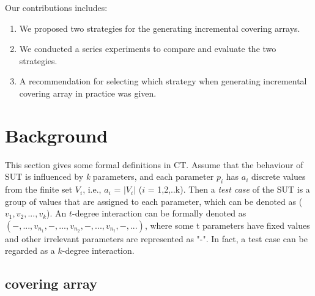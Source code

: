 \documentclass[conference]{IEEEtran}
\theoremstyle{definition}
\begin{document}
%


%
%
%
%
Our contributions includes:

 \begin{enumerate}
 \item  We proposed two strategies for the generating incremental covering arrays.
 \item  We conducted a series experiments to compare and evaluate the two strategies.
 \item  A recommendation for selecting which strategy when generating incremental covering array in practice was given.
\end{enumerate}
%

\section{Background}
This section gives some formal definitions in CT. Assume that the behaviour of SUT is influenced by \emph{k} parameters, and each parameter $p_{i}$ has $a_{i}$ discrete values from the finite set $V_{i}$, i.e., $a_{i}$ = $|V_{i}|$ ($i$ = 1,2,..k). Then a \emph{test case} of the SUT is a group of values that are assigned to each parameter, which can be denoted as ($v_{1}, v_{2}, ..., v_{k}$). An $t$-degree interaction can be formally denoted as $(-, ..., v_{n_{1}}, -, ..., v_{n_{2}},-, ...,v_{n_{t}}, -, ...)$, where some t parameters have fixed values and other irrelevant parameters are represented as "-". In fact, a test case can be regarded as a $k$-degree interaction.


\subsection{covering array}
\end{document}
